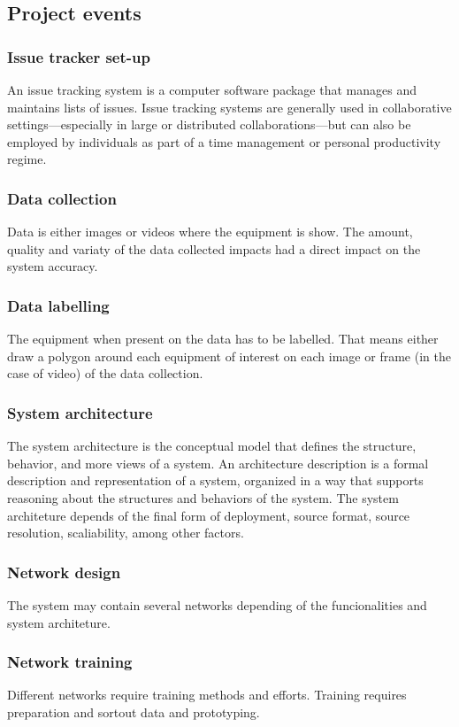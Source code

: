 \documentclass{article}
\begin{document}
\subsection{Project events}
\label{sec:orge628b90}
\subsubsection{Issue tracker set-up}
\label{sec:orgde3aeba}
An issue tracking system is a computer software package that manages and maintains lists of issues.
Issue tracking systems are generally used in collaborative settings—especially in large or distributed collaborations—but can also be employed by individuals as part of a time management or personal productivity regime.
\subsubsection{Data collection}
\label{sec:org51f0dd9}
Data is either images or videos where the equipment is show.
The amount, quality and variaty of the data collected impacts had a direct impact on the system accuracy. 
\subsubsection{Data labelling}
\label{sec:org2932892}
The equipment when present on the data has to be labelled.
That means either draw a polygon around each equipment of interest on each image or frame (in the case of video) of the data collection.
\subsubsection{System architecture}
\label{sec:orgea111de}
The system architecture is the conceptual model that defines the structure, behavior, and more views of a system.
An architecture description is a formal description and representation of a system, organized in a way that supports reasoning about the structures and behaviors of the system.
The system architeture depends of the final form of deployment, source format, source resolution, scaliability, among other factors.
\subsubsection{Network design}
\label{sec:org0a99596}
The system may contain several networks depending of the funcionalities and system architeture.
\subsubsection{Network training}
\label{sec:org21f2b92}
Different networks require training methods and efforts.
Training requires preparation and sortout data and prototyping.
\end{document}
